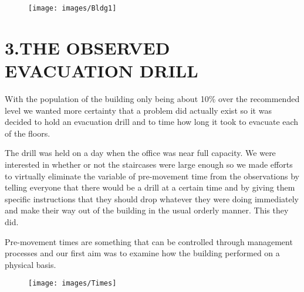 \documentclass{style/llncs}
\begin{document}
\begin{figure}[tbp]%
\begin{mdcenter}%

\noindent{}\texttt{[image: images/Bldg1]}{}%

\mdhr{}%

\noindent{}%
\end{mdcenter}\label{fig-1}%
\end{figure}%

\section{3.\hspace*{0.5em}THE OBSERVED EVACUATION DRILL}\label{sec-the-observed-evacuation-drill}%

\noindent{}With the population of the building only being about 10\% over the recommended level we wanted more certainty that a problem did actually exist so it was decided to hold an evacuation drill and to time how long it took to evacuate each of the floors.%

The drill was held on a day when the office was near full capacity.  We were interested in whether or not the staircases were large enough so we made efforts to virtually eliminate the variable of pre-movement time from the observations by telling everyone that there would be a drill at a certain time and by giving them specific instructions that they should drop whatever they were doing immediately and make their way out of the building in the usual orderly manner.  This they did. %

Pre-movement times are something that can be controlled through management processes and our first aim was to examine how the building performed on a physical basis.%

\begin{figure}[tbp]%
\begin{mdcenter}%

\noindent{}\texttt{[image: images/Times]}{}%

\mdhr{}%

\noindent{}%
\end{mdcenter}\label{fig-2}%
\end{figure}%
\end{document}
